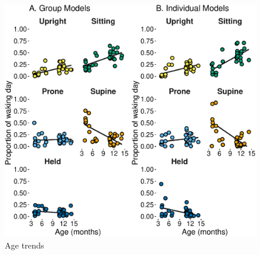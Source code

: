 \documentclass[
  man]{apa6}
\begin{document}
\begin{figure}

{\centering \includegraphics{manuscript_files/figure-latex/age-1} 

}

\caption{Age trends}\label{fig:age}
\end{figure}
\end{document}

